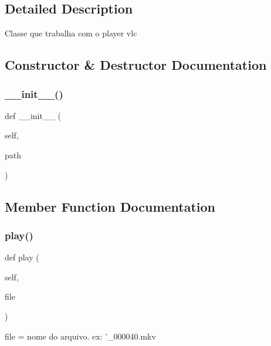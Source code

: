 \subsection{Detailed Description}
\begin{DoxyVerb}Classe que trabalha com o player vlc\end{DoxyVerb}
 

\subsection{Constructor \& Destructor Documentation}
\mbox{\label{class_client_1_1_player_a641e652e956870aa1ad588d8c1e07fc4}} 
\subsubsection{\texorpdfstring{\+\_\+\+\_\+init\+\_\+\+\_\+()}{\_\_init\_\_()}}
{\footnotesize\ttfamily def \+\_\+\+\_\+init\+\_\+\+\_\+ (\begin{DoxyParamCaption}\item[{}]{self,  }\item[{}]{path }\end{DoxyParamCaption})}



\subsection{Member Function Documentation}
\mbox{\label{class_client_1_1_player_a731e7fe9b0406bdfaba7283d9fdfa810}} 
\subsubsection{\texorpdfstring{play()}{play()}}
{\footnotesize\ttfamily def play (\begin{DoxyParamCaption}\item[{}]{self,  }\item[{}]{file }\end{DoxyParamCaption})}

\begin{DoxyVerb}file = nome do arquivo. ex: '_000040.mkv\end{DoxyVerb}
 

